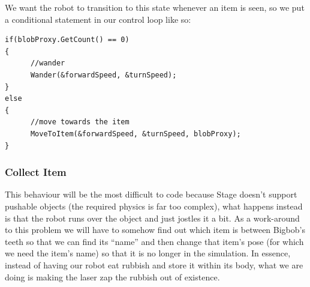 \documentclass[a4paper]{report}
\begin{document}
We want the robot to transition to this state whenever an item is seen, so we put a conditional statement in our control loop like so:
\begin{verbatim}
if(blobProxy.GetCount() == 0)
{
      //wander
      Wander(&forwardSpeed, &turnSpeed);
}
else
{
      //move towards the item
      MoveToItem(&forwardSpeed, &turnSpeed, blobProxy);
}
\end{verbatim}

\subsubsection{Collect Item}
This behaviour will be the most difficult to code because Stage doesn't support pushable objects (the required physics is far too complex), what happens instead is that the robot runs over the object and just jostles it a bit. 
As a work-around to this problem we will have to somehow find out which item is between Bigbob's teeth so that we can find its ``name'' and then change that item's pose (for which we need the item's name) so that it is no longer in the simulation. In essence, instead of having our robot eat rubbish and store it within its body, what we are doing is making the laser zap the rubbish out of existence.
\end{document}
